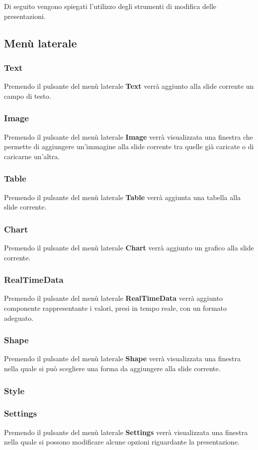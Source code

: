 \noindent
Di seguito vengono spiegati l'utilizzo degli strumenti di modifica delle presentazioni.

\subsection{Menù laterale}
\subsubsection{Text}
Premendo il pulsante del menù laterale \textbf{Text} verrà aggiunto alla slide corrente un campo di testo.
\subsubsection{Image}
Premendo il pulsante del menù laterale \textbf{Image} verrà visualizzata una finestra che permette di aggiungere un'immagine alla slide corrente tra quelle già caricate o di caricarne un'altra.
\subsubsection{Table}
Premendo il pulsante del menù laterale \textbf{Table} verrà aggiunta una tabella alla slide corrente.
\subsubsection{Chart}
Premendo il pulsante del menù laterale \textbf{Chart} verrà aggiunto un grafico alla slide corrente.
\subsubsection{RealTimeData}
Premendo il pulsante del menù laterale \textbf{RealTimeData} verrà aggiunto componente rappresentante i valori, presi in tempo reale, con un formato adeguato.
\subsubsection{Shape}
Premendo il pulsante del menù laterale \textbf{Shape} verrà visualizzata una finestra nella quale si può scegliere una forma da aggiungere alla slide corrente.
\subsubsection{Style}
\subsubsection{Settings}
Premendo il pulsante del menù laterale \textbf{Settings} verrà visualizzata una finestra nella quale si possono modificare alcune opzioni riguardante la presentazione.

